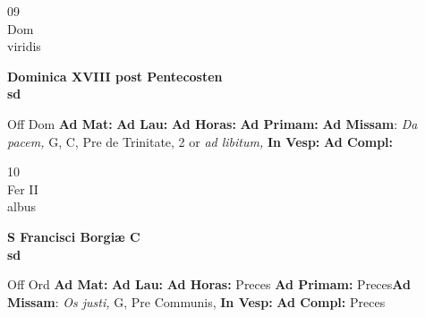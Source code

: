 \documentclass[10pt, openany]{book}
\begin{document}
    \begin{center}
        \begin{minipage}{3.5in}
            \vspace{2em}
            \begin{minipage}{0.5in}
                {\Huge 09} \\
                {\normalsize Dom} \\
                {\normalsize viridis}
            \end{minipage}
            \begin{minipage}{3.0in}
                \textbf{ \large Dominica XVIII post Pentecosten \\
                \textnormal{\normalsize sd}} \\ 
            \end{minipage}
            \begin{justify}Off Dom
                \textbf{Ad Mat: }
                \textbf{Ad Lau: }
                \textbf{Ad Horas: }
                \textbf{Ad Primam: }\textbf{Ad Missam}: \textit{Da pacem,} G, C, Pre de Trinitate, 2 or \textit{ad libitum,}  
                \textbf{In Vesp: }
                \textbf{Ad Compl: }
            \end{justify}
        \end{minipage}
    \end{center}

    \begin{center}
        \begin{minipage}{3.5in}
            \vspace{2em}
            \begin{minipage}{0.5in}
                {\Huge 10} \\
                {\normalsize Fer II} \\
                {\normalsize albus}
            \end{minipage}
            \begin{minipage}{3.0in}
                \textbf{ \large S Francisci Borgiæ C \\
                \textnormal{\normalsize sd}} \\ 
            \end{minipage}
            \begin{justify}Off Ord
                \textbf{Ad Mat: }
                \textbf{Ad Lau: }
                \textbf{Ad Horas: }Preces
                \textbf{Ad Primam: }Preces\textbf{Ad Missam}: \textit{Os justi,} G, Pre Communis,  
                \textbf{In Vesp: }
                \textbf{Ad Compl: }Preces
            \end{justify}
        \end{minipage}
    \end{center}
\end{document}
